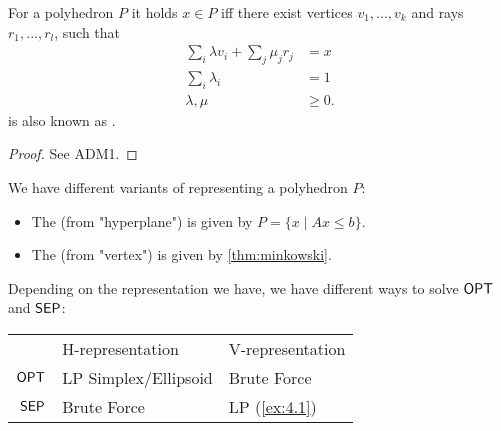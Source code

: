 \begin{theorem}[Minkowski] \label{thm:minkowski}
    For a polyhedron $P$ it holds $x \in P$ iff there exist vertices $v_1,...,v_k$
    and rays $r_1, ..., r_l$, such that
    \begin{align*}
        \sum_i \lambda v_i + \sum_j \mu_j r_j & = x     \\
        \sum_i \lambda_i                      & = 1     \\
        \lambda, \mu                          & \geq 0.
    \end{align*}
     is also known as .
\end{theorem}
\begin{proof}
    See ADM1.
\end{proof}
\begin{definition}
    We have different variants of representing a polyhedron $P$:
    \begin{itemize}
        \item The  (from "hyperplane") is given by $P=\{x \mid Ax \leq b\}$.
        \item The  (from "vertex") is given by \autoref{thm:minkowski}.
    \end{itemize}
\end{definition}
\begin{conclusion}
    Depending on the representation we have, we have different ways to solve $\mathsf{OPT}$ and $\mathsf{SEP}$:
    \\
    \begin{center}
        \begin{tabular}{rll}
                                        & H-representation                          & V-representation                           \\ \cline{2-3}
            \multicolumn{1}{r|}{$\mathsf{OPT}$} & \multicolumn{1}{l|}{LP Simplex/Ellipsoid} & \multicolumn{1}{l|}{Brute Force}           \\ \cline{2-3}
            \multicolumn{1}{r|}{$\mathsf{SEP}$} & \multicolumn{1}{l|}{Brute Force}          & \multicolumn{1}{l|}{LP (\autoref{ex:4.1})} \\ \cline{2-3}
        \end{tabular}
    \end{center}

\end{conclusion}
